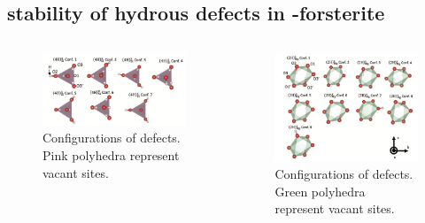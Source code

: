 \documentclass[13pt,aspectratio=169]{beamer}
\begin{document}
\subsection{stability of hydrous defects in -forsterite}

\begin{frame}{\subsecname}
	\begin{columns}
		\begin{column}{0.4\textwidth}
			\begin{figure}
				\includegraphics[width=\columnwidth]{images/si}%
				\caption{Configurations of 
				defects. Pink polyhedra represent vacant  sites.}
			\end{figure}
		\end{column}

		\begin{column}{0.4\textwidth}
			\begin{figure}
				\includegraphics[width=\columnwidth]{images/mg}%
				\caption{Configurations of 
				defects. Green polyhedra represent vacant  sites.}
			\end{figure}
		\end{column}
	\end{columns}
\end{frame}
\end{document}
